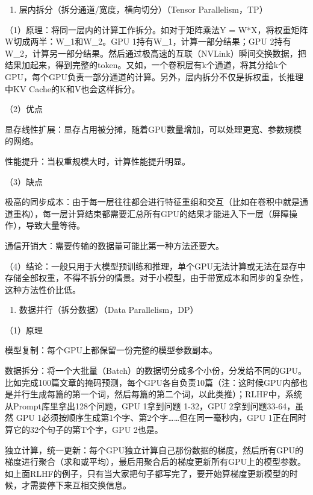 \begin{enumerate}
\def\labelenumi{\arabic{enumi}.}
\setcounter{enumi}{1}
\tightlist
\item
  层内拆分（拆分通道/宽度，横向切分）（Tensor Parallelism，TP）
\end{enumerate}

（1）原理：将同一层内的计算工作拆分。如对于矩阵乘法Y = W*X，将权重矩阵W切成两半：W\_1和W\_2。GPU 1持有W\_1，计算一部分结果；GPU 2持有W\_2，计算另一部分结果。然后通过极高速的互联（NVLink）瞬间交换数据，把结果加起来，得到完整的token。又如，一个卷积层有k个通道，将其分给k个GPU，每个GPU负责一部分通道的计算。另外，层内拆分不仅是拆权重，长推理中KV Cache的K和V也会这样拆分。

（2）优点

显存线性扩展：显存占用被分摊，随着GPU数量增加，可以处理更宽、参数规模的网络。

性能提升：当权重规模大时，计算性能提升明显。

（3）缺点

极高的同步成本：由于每一层往往都会进行特征重组和交互（比如在卷积中就是通道重构），每一层计算结束都需要汇总所有GPU的结果才能进入下一层（屏障操作），导致大量等待。

通信开销大：需要传输的数据量可能比第一种方法还要大。

（4）结论：一般只用于大模型预训练和推理，单个GPU无法计算或无法在显存中存储全部权重，不得不拆分的情景。对于小模型，由于带宽成本和同步的复杂性，这种方法性价比低。

\begin{enumerate}
\def\labelenumi{\arabic{enumi}.}
\setcounter{enumi}{2}
\tightlist
\item
  数据并行（拆分数据）（Data Parallelism，DP）
\end{enumerate}

（1）原理

模型复制：每个GPU上都保留一份完整的模型参数副本。

数据拆分：将一个大批量（Batch）的数据切分成多个小份，分发给不同的GPU。比如完成100篇文章的掩码预测，每个GPU各自负责10篇（注：这时候GPU内部也是并行生成每篇的第一个词，然后每篇的第二个词，以此类推）；RLHF中，系统从Prompt库里拿出128个问题，GPU 1拿到问题 1-32，GPU 2拿到问题33-64，虽然 GPU 1必须按顺序生成第1个字、第2个字\ldots\ldots 但在同一毫秒内，GPU 1正在同时算它的32个句子的第T个字，GPU 2也是。

独立计算，统一更新：每个GPU独立计算自己那份数据的梯度，然后所有GPU的梯度进行聚合（求和或平均），最后用聚合后的梯度更新所有GPU上的模型参数。如上面RLHF的例子，只有当大家把句子都写完了，要开始算梯度更新模型的时候，才需要停下来互相交换信息。


